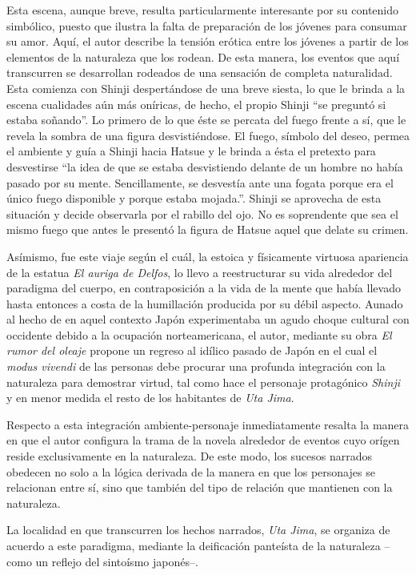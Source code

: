 Esta escena, aunque breve, resulta particularmente interesante por su contenido simbólico, puesto que ilustra la falta de preparación de los jóvenes para consumar su amor. Aquí, el autor describe la tensión erótica entre los jóvenes a partir de los elementos de la naturaleza que los rodean. De esta manera, los eventos que aquí transcurren se desarrollan rodeados de una sensación de completa naturalidad. Esta comienza con Shinji despertándose de una breve siesta, lo que le brinda a la escena cualidades aún más oníricas, de hecho, el propio Shinji ``se preguntó si estaba soñando''.%
 Lo primero de lo que éste se percata del fuego frente a sí, que le revela la sombra de una figura desvistiéndose. El fuego, símbolo del deseo, permea el ambiente y guía a Shinji hacia Hatsue y le brinda a ésta el pretexto para desvestirse ``la idea de que se estaba desvistiendo delante de un hombre no había pasado por su mente. Sencillamente, se desvestía ante una fogata porque era el único fuego disponible y porque estaba mojada.''. Shinji se aprovecha de esta situación y decide observarla por el rabillo del ojo. No es soprendente que sea el mismo fuego que antes le presentó la figura de Hatsue aquel que delate su crimen. 

Asímismo, fue este viaje según el cuál, la estoica y físicamente virtuosa apariencia de la estatua \emph{El auriga de Delfos}, lo llevo a reestructurar su vida alrededor del paradigma del cuerpo, en contraposición a la vida de la mente que había llevado hasta entonces a costa de la humillación producida por su débil aspecto. Aunado al hecho de en aquel contexto Japón experimentaba un agudo choque cultural con occidente debido a la ocupación norteamericana, el autor, mediante su obra \emph{El rumor del oleaje} propone un regreso al idílico pasado de Japón en el cual el \emph{modus vivendi} de las personas debe procurar una profunda integración con la naturaleza para demostrar virtud, tal como hace el personaje protagónico \emph{Shinji} y en menor medida el resto de los habitantes de \emph{Uta Jima}. %

 Respecto a esta integración ambiente-personaje inmediatamente resalta la manera en que el autor configura la trama de la novela alrededor de eventos cuyo orígen reside exclusivamente en la naturaleza. De este modo, los sucesos narrados obedecen no solo a la lógica derivada de la manera en que los personajes se relacionan entre sí, sino que también del tipo de relación que mantienen con la naturaleza.

  La localidad en que transcurren los hechos narrados, \emph{Uta Jima}, se organiza  de acuerdo a este paradigma, mediante la deificación panteísta de la naturaleza --como un reflejo del sintoísmo japonés--. %
